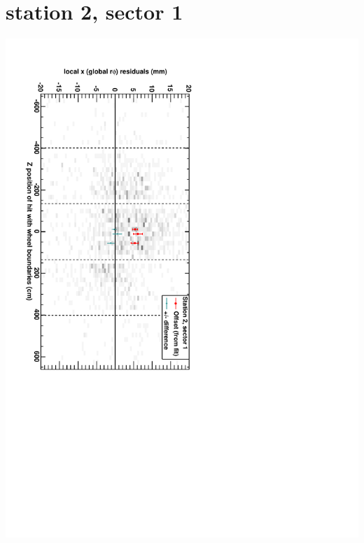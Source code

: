 \documentclass[compress]{beamer}
\begin{document}
\section*{station 2, sector 1}
\begin{frame} \vfill \mbox{\hspace{-1 cm}\includegraphics[height=1.2\linewidth, angle=90]{DTrphiVsZ_st2_sr01.pdf}} \end{frame}
\end{document}
